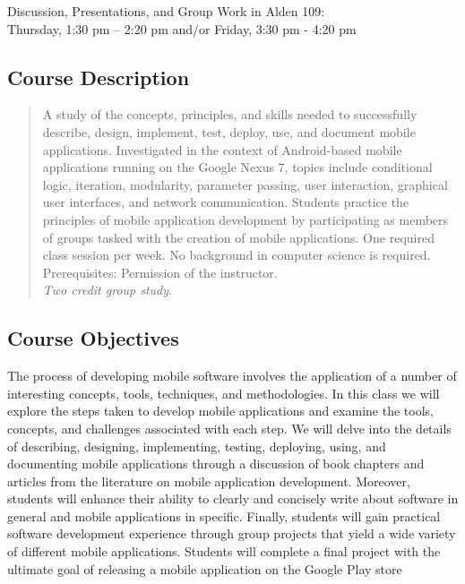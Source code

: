 Discussion, Presentations, and Group Work in Alden 109: \\ Thursday, 1:30 pm -- 2:20 pm and/or Friday, 3:30 pm - 4:20 pm 

\subsection*{Course Description}

\begin{quote}

	A study of the concepts, principles, and skills needed to successfully describe, design, implement, test, deploy,
	use, and document mobile applications.  Investigated in the context of Android-based mobile applications running on
	the Google Nexus 7, topics include conditional logic, iteration, modularity, parameter passing, user interaction,
	graphical user interfaces, and network communication. Students practice the principles of mobile application
	development by participating as members of groups tasked with the creation of mobile applications.  One required
	class session per week. No background in computer science is required. Prerequisites: Permission of the instructor.
	\\ {\em Two credit group study}.
	
\end{quote}

\subsection*{Course Objectives}

The process of developing mobile software involves the application of a number of interesting concepts, tools,
techniques, and methodologies.  In this class we will explore the steps taken to develop mobile applications and examine
the tools, concepts, and challenges associated with each step.  We will delve into the details of describing, designing,
implementing, testing, deploying, using, and documenting mobile applications through a discussion of book chapters and
articles from the literature on mobile application development.  Moreover, students will enhance their ability to
clearly and concisely write about software in general and mobile applications in specific.  Finally, students will gain
practical software development experience through group projects that yield a wide variety of different mobile
applications. Students will complete a final project with the ultimate goal of releasing a mobile application on the
Google Play store

